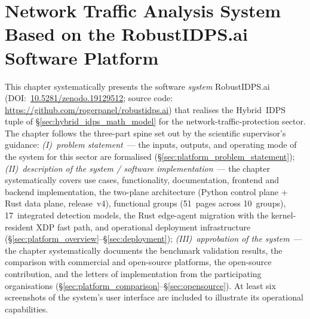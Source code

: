 
\chapter{Network Traffic Analysis System Based on the RobustIDPS.ai Software Platform}
\label{ch:platform}

This chapter systematically presents the software \emph{system}
\textsf{RobustIDPS.ai}~\cite{Anaedevha2026robustidps}
(DOI:~\url{10.5281/zenodo.19129512}; source code:
\url{https://github.com/rogerpanel/robustidps.ai}) that realises
the Hybrid~IDPS tuple of \S\ref{sec:hybrid_idps_math_model} for the
network-traffic-protection sector. The chapter follows the
three-part spine set out by the scientific supervisor's guidance:
\emph{(I)~problem statement}~--- the inputs, outputs, and operating
mode of the system for this sector are formalised
(\S\ref{sec:platform_problem_statement});
\emph{(II)~description of the system / software implementation}~---
the chapter systematically covers use cases, functionality,
documentation, frontend and backend implementation, the two-plane
architecture (Python control plane + Rust data plane, release~v4),
functional groups (51~pages across 10~groups), 17~integrated
detection models, the Rust edge-agent migration with the kernel-
resident XDP fast path, and operational deployment infrastructure
(\S\ref{sec:platform_overview}--\S\ref{sec:deployment});
\emph{(III)~approbation of the system}~--- the chapter
systematically documents the benchmark validation results, the
comparison with commercial and open-source platforms, the
open-source contribution, and the letters of implementation from
the participating organisations
(\S\ref{sec:platform_comparison}--\S\ref{sec:opensource}). At
least six screenshots of the system's user interface are included
to illustrate its operational capabilities.


